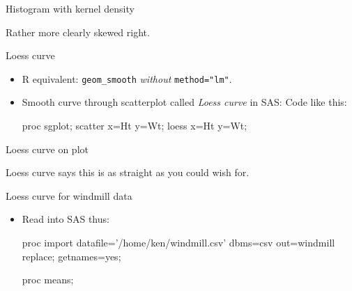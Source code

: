 \documentclass[unknownkeysallowed]{beamer}\usepackage[]{graphicx}\usepackage[]{color}
\begin{document}
\begin{frame}[fragile]{Histogram with kernel density}


Rather more clearly skewed right.  
  
\end{frame}


\begin{frame}[fragile]{Loess curve}

  \begin{itemize}
  \item R equivalent: \texttt{geom\_smooth} \emph{without} \texttt{method="lm"}.
  \item Smooth curve through scatterplot called \emph{Loess curve}  in SAS: Code like this:
\begin{Sascode}[store=mjc]
proc sgplot;
  scatter x=Ht y=Wt;
  loess x=Ht y=Wt;
\end{Sascode}


  \end{itemize}
  
\end{frame}

\begin{frame}[fragile]{Loess curve on plot}
  
  
  Loess curve says this is as straight as you could wish for.
\end{frame}

\begin{frame}[fragile]{Loess curve for windmill data}
  
  \begin{itemize}
  \item Read into SAS thus:
    
  \begin{Datastep}
proc import
  datafile='/home/ken/windmill.csv'
    dbms=csv
    out=windmill
    replace;
  getnames=yes;
  \end{Datastep}
  
  \begin{Sascode}[store=ng]
proc means;    
  \end{Sascode}
  
    
  \end{itemize}
  
\end{frame}
\end{document}

